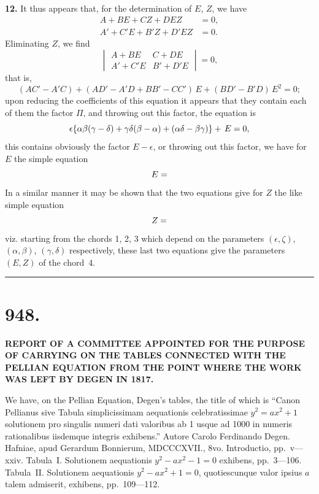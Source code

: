 \documentclass[12pt,a4paper]{article}
\begin{document}
\textbf{12.} It thus appears that, for the determination of $E$, $Z$, we have
\[
\begin{aligned}
A + BE + CZ + DEZ &= 0, \\
A' + C'E + B'Z + D'EZ &= 0.
\end{aligned}
\]
Eliminating $Z$, we find
\[
\begin{vmatrix}
A + BE & C + DE \\
A' + C'E & B' + D'E
\end{vmatrix} = 0,
\]
that is,
\[
(AC' - A'C) + (AD' - A'D + BB' - CC')\,E + (BD' - B'D)\,E^{2} = 0;
\]
upon reducing the coefficients of this equation it appears that they contain each of them the factor $\Pi$, and throwing out this factor, the equation is
\[
\epsilon\{\alpha\beta(\gamma-\delta) + \gamma\delta(\beta-\alpha) + (\alpha\delta - \beta\gamma)\} + \dotfill\,E = 0,
\]
this contains obviously the factor $E - \epsilon$, or throwing out this factor, we have for $E$ the simple equation
\[ E = \dotfill \]
In a similar manner it may be shown that the two equations give for $Z$ the like simple equation
\[ Z = \dotfill \]
viz. starting from the chords 1, 2, 3 which depend on the parameters $(\epsilon, \zeta)$, $(\alpha, \beta)$, $(\gamma, \delta)$ respectively, these last two equations give the parameters $(E, Z)$ of the chord~4.

\vspace{1em}
\hrule
\vspace{1em}


\newpage
\section*{948.}

\begin{center}
{\large\bfseries REPORT OF A COMMITTEE APPOINTED FOR THE PURPOSE OF CARRYING ON THE TABLES CONNECTED WITH THE PELLIAN EQUATION FROM THE POINT WHERE THE WORK WAS LEFT BY DEGEN IN 1817.}
\end{center}

\begin{flushright}
\end{flushright}

We have, on the Pellian Equation, Degen's tables, the title of which is ``Canon Pellianus sive Tabula simplicissimam aequationis celebratissimae $y^{2} = ax^{2} + 1$ solutionem pro singulis numeri dati valoribus ab 1 usque ad 1000 in numeris rationalibus iisdemque integris exhibens.'' Autore Carolo Ferdinando Degen. Hafniae, apud Gerardum Bonnierum, MDCCCXVII., 8vo. Introductio, pp.~v---xxiv. Tabula~I. Solutionem aequationis $y^{2} - ax^{2} - 1 = 0$ exhibens, pp.~3---106. Tabula~II. Solutionem aequationis $y^{2} - ax^{2} + 1 = 0$, quotiescunque valor ipsius $a$ talem admiserit, exhibens, pp.~109---112.
\end{document}
